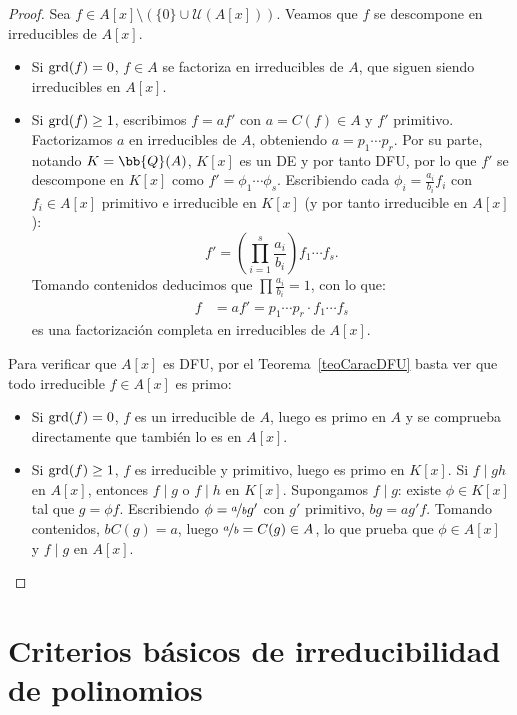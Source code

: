 \begin{proof}
    Sea $f \in A[x] \setminus (\{0\} \cup \mathcal{U}(A[x]))$. Veamos que $f$ se descompone en irreducibles de $A[x]$.
    \begin{itemize} 
        \item Si $\operatorname{grd}(f) = 0$, $f \in A$ se factoriza en irreducibles de $A$, que siguen siendo irreducibles en $A[x]$.
        \item Si $\operatorname{grd}(f) \geq 1$, escribimos $f = a f'$ con $a = C(f) \in A$ y $f'$ primitivo. Factorizamos $a$ en irreducibles de $A$, obteniendo $a = p_1 \cdots p_r$. Por su parte, notando $K=\bb{Q}(A)$, $K[x]$ es un DE y por tanto DFU, por lo que $f'$ se descompone en $K[x]$ como $f' = \phi_1 \cdots \phi_s$. Escribiendo cada $\phi_i = \frac{a_i}{b_i} f_i$ con $f_i \in A[x]$ primitivo e irreducible en $K[x]$ (y por tanto irreducible en $A[x]$):
        \[
            f' = \left(\prod\limits_{i=1}^s \frac{a_i}{b_i}\right) f_1 \cdots f_s.
        \]
        Tomando contenidos deducimos que $\prod \frac{a_i}{b_i} = 1$, con lo que:
        \begin{align*}
            f &= a f' = p_1 \cdots p_r \cdot f_1 \cdots f_s
        \end{align*}
        es una factorización completa en irreducibles de $A[x]$.
    \end{itemize}

    Para verificar que $A[x]$ es DFU, por el Teorema~\ref{teoCaracDFU} basta ver que todo irreducible $f \in A[x]$ es primo:
    \begin{itemize}
        \item Si $\operatorname{grd}(f) = 0$, $f$ es un irreducible de $A$, luego es primo en $A$ y se comprueba directamente que también lo es en $A[x]$.
        \item Si $\operatorname{grd}(f) \geq 1$, $f$ es irreducible y primitivo, luego es primo en $K[x]$. Si $f \mid gh$ en $A[x]$, entonces $f \mid g$ o $f \mid h$ en $K[x]$. Supongamos $f \mid g$: existe $\phi \in K[x]$ tal que $g = \phi f$. Escribiendo $\phi = \nicefrac{a}{b} g'$ con $g'$ primitivo, $bg = a g' f$. Tomando contenidos, $b C(g) = a$, luego $\nicefrac{a}{b} = C(g) \in A$, lo que prueba que $\phi \in A[x]$ y $f \mid g$ en $A[x]$. \qedhere
    \end{itemize}
\end{proof}

\section{Criterios básicos de irreducibilidad de polinomios}


